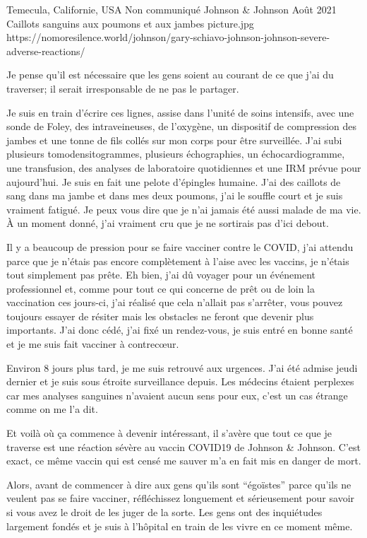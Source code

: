 {Temecula, Californie, USA}
{Non communiqué}
{Johnson \& Johnson}
{Août 2021}
{Caillots sanguins aux poumons et aux jambes}
{picture.jpg}
{https://nomoresilence.world/johnson/gary-schiavo-johnson-johnson-severe-adverse-reactions/}
{

Je pense qu'il est nécessaire que les gens soient au courant de ce que j'ai du
traverser; il serait irresponsable de ne pas le partager.

Je suis en train d'écrire ces lignes, assise dans l'unité de soins intensifs,
avec une sonde de Foley, des intraveineuses, de l'oxygène, un dispositif de
compression des jambes et une tonne de fils collés sur mon corps pour être
surveillée. J'ai subi plusieurs tomodensitogrammes, plusieurs échographies, un
échocardiogramme, une transfusion, des analyses de laboratoire quotidiennes et
une IRM prévue pour aujourd'hui. Je suis en fait une pelote d'épingles
humaine. J'ai des caillots de sang dans ma jambe et dans mes deux poumons, j'ai
le souffle court et je suis vraiment fatigué. Je peux vous dire que je n'ai
jamais été aussi malade de ma vie. À un moment donné, j'ai vraiment cru que je
ne sortirais pas d'ici debout.

Il y a beaucoup de pression pour se faire vacciner contre le COVID, j'ai attendu
parce que je n'étais pas encore complètement à l'aise avec les vaccins, je
n'étais tout simplement pas prête. Eh bien, j'ai dû voyager pour un événement
professionnel et, comme pour tout ce qui concerne de prêt ou de loin la
vaccination ces jours-ci, j'ai réalisé que cela n'allait pas s'arrêter, vous
pouvez toujours essayer de résiter mais les obstacles ne feront que devenir plus
importants. J'ai donc cédé, j'ai fixé un rendez-vous, je suis entré en bonne
santé et je me suis fait vacciner à contrecœur.

Environ 8 jours plus tard, je me suis retrouvé aux urgences. J'ai été admise
jeudi dernier et je suis sous étroite surveillance depuis. Les médecins étaient
perplexes car mes analyses sanguines n'avaient aucun sens pour eux, c'est un cas
étrange comme on me l'a dit.

Et voilà où ça commence à devenir intéressant, il s'avère que tout ce que je
traverse est une réaction sévère au vaccin COVID19 de Johnson \& Johnson. C'est
exact, ce même vaccin qui est censé me sauver m'a en fait mis en danger de mort.

Alors, avant de commencer à dire aux gens qu'ils sont “égoïstes” parce qu'ils ne
veulent pas se faire vacciner, réfléchissez longuement et sérieusement pour
savoir si vous avez le droit de les juger de la sorte. Les gens ont des
inquiétudes largement fondés et je suis à l'hôpital en train de les vivre en ce
moment même.

}
